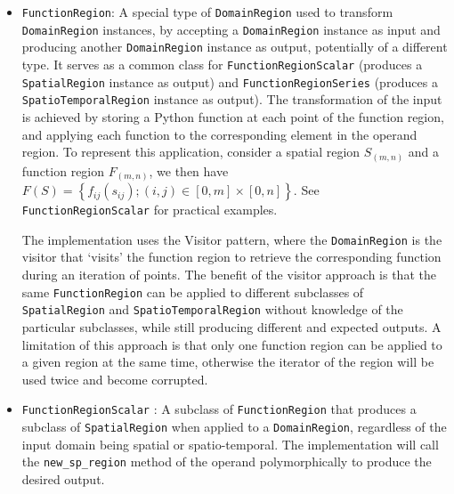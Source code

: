 \begin{itemize}
	\item \texttt{FunctionRegion}:
	A special type of \texttt{DomainRegion} used to transform \texttt{DomainRegion} instances, by accepting a \texttt{DomainRegion} instance as input and producing another \texttt{DomainRegion} instance as output, potentially of a different type. It serves as a common class for \texttt{FunctionRegionScalar} (produces a \texttt{SpatialRegion} instance as output) and \texttt{FunctionRegionSeries} (produces a \texttt{SpatioTemporalRegion} instance as output). The transformation of the input is achieved by storing a Python function at each point of the function region, and applying each function to the corresponding element in the operand region. To represent this application, consider a spatial region $S_{(m,n)}$ and a function region $F_{(m,n)}$, we then have $F(S) = \left\{ f_{ij}(s_{ij}); (i, j) \in [0, m]\times[0, n] \right\}$. See \texttt{FunctionRegionScalar} for practical examples.

	The implementation uses the Visitor pattern, where the \texttt{DomainRegion} is the visitor that `visits' the function region to retrieve the corresponding function during an iteration of points. The benefit of the visitor approach is that the same \texttt{FunctionRegion} can be applied to different subclasses of \texttt{SpatialRegion} and \texttt{SpatioTemporalRegion} without knowledge of the particular subclasses, while still producing different and expected outputs. A limitation of this approach is that only one function region can be applied to a given region at the same time, otherwise the iterator of the region will be used twice and become corrupted.
	
	
	\item \texttt{FunctionRegionScalar}%
	: A subclass of \texttt{FunctionRegion} that produces a subclass of \texttt{SpatialRegion} when applied to a \texttt{DomainRegion}, regardless of the input domain being spatial or spatio-temporal. The implementation will call the \texttt{new\_sp\_region} method of the operand polymorphically to produce the desired output.
	

\end{itemize}
